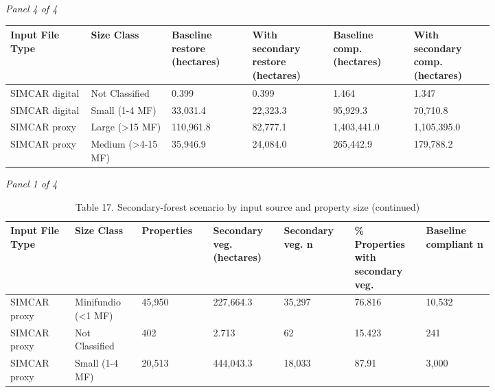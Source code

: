 \documentclass[12pt]{article}
\begin{document}
\begin{landscape}
\begin{table}[H]
\textit{Panel 4 of 4}\\[2pt]
{\fontsize{12}{14}\selectfont
\setlength{\tabcolsep}{3pt}
\renewcommand{\arraystretch}{1.08}
\begin{tabular}{p{0.137\linewidth}p{0.137\linewidth}p{0.137\linewidth}p{0.137\linewidth}p{0.137\linewidth}p{0.137\linewidth}}
\toprule
Input File Type & Size Class & Baseline restore (hectares) & With secondary restore (hectares) & Baseline comp. (hectares) & With secondary comp. (hectares) \\
\midrule
SIMCAR digital & Not Classified & 0.399 & 0.399 & 1.464 & 1.347 \\
SIMCAR digital & Small (1-4 MF) & 33,031.4 & 22,323.3 & 95,929.3 & 70,710.8 \\
SIMCAR proxy & Large (>15 MF) & 110,961.8 & 82,777.1 & 1,403,441.0 & 1,105,395.0 \\
SIMCAR proxy & Medium (>4-15 MF) & 35,946.9 & 24,084.0 & 265,442.9 & 179,788.2 \\
\bottomrule
\end{tabular}
}
\end{table}
\begin{table}[H]
\centering
\caption{Table 17. Secondary-forest scenario by input source and property size (continued)}
\textit{Panel 1 of 4}\\[2pt]
{\fontsize{12}{14}\selectfont
\setlength{\tabcolsep}{3pt}
\renewcommand{\arraystretch}{1.08}
\begin{tabular}{p{0.117\linewidth}p{0.117\linewidth}p{0.117\linewidth}p{0.117\linewidth}p{0.117\linewidth}p{0.117\linewidth}p{0.117\linewidth}}
\toprule
Input File Type & Size Class & Properties & Secondary veg. (hectares) & Secondary veg. n & \% Properties with secondary veg. & Baseline compliant n \\
\midrule
SIMCAR proxy & Minifundio (<1 MF) & 45,950 & 227,664.3 & 35,297 & 76.816 & 10,532 \\
SIMCAR proxy & Not Classified & 402 & 2.713 & 62 & 15.423 & 241 \\
SIMCAR proxy & Small (1-4 MF) & 20,513 & 444,043.3 & 18,033 & 87.91 & 3,000 \\
\bottomrule
\end{tabular}
}

\vspace{0.6em}


\end{table}
\end{landscape}
\end{document}
